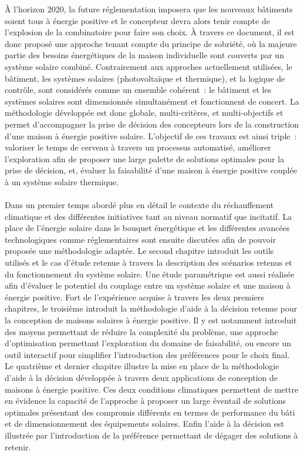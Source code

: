 À l’horizon $2020$, la future réglementation imposera que les nouveaux bâtiments soient
tous à énergie positive et le concepteur devra alors tenir compte de l’explosion de la
combinatoire pour faire son choix. À travers ce document, il est donc proposé une approche
tenant compte du principe de sobriété, où la majeure partie des besoins énergétiques de la
maison individuelle sont couverts par un système solaire combiné. Contrairement aux
approches actuellement utilisées, le bâtiment, les systèmes solaires (photovoltaïque et
thermique), et la logique de contrôle, sont considérés comme un ensemble cohérent~: le
bâtiment et les systèmes solaires sont dimensionnés simultanément et fonctionnent de
concert. La méthodologie développée est donc globale, multi-critères, et multi-objectifs
et permet d’accompagner la prise de décision des concepteurs lors de la construction d’une
maison à énergie positive solaire. L’objectif de ces travaux est ainsi triple~: valoriser
le temps de cerveau à travers un processus automatisé, améliorer l’exploration afin de
proposer une large palette de solutions optimales pour la prise de décision, et, évaluer
la faisabilité d’une maison à énergie positive couplée à un système solaire thermique.


\paragraph{} %
Dans un premier temps abordé plus en détail le contexte du réchauffement
climatique et des différentes initiatives tant au niveau normatif que incitatif. La place
de l’énergie solaire dans le bouquet énergétique et les différentes avancées technologiques
comme réglementaires sont ensuite discutées afin de pouvoir proposée une méthodologie
adaptée. Le second chapitre introduit les outils utilisés et le cas d’étude retenue à
travers la description des scénarios retenus et du fonctionnement du système solaire. Une
étude paramétrique est aussi réalisée afin d’évaluer le potentiel du couplage entre un
système solaire et une maison à énergie positive. Fort de l’expérience acquise à travers
les deux premiers chapitres, le troisième introduit la méthodologie d’aide à la décision
retenue pour la conception de maisons solaires à énergie positive. Il y est notamment
introduit des moyens permettant de réduire la complexité du problème, une approche
d’optimisation permettant l’exploration du domaine de faisabilité, ou encore un outil
interactif pour simplifier l’introduction des préférences pour le choix final. Le
quatrième et dernier chapitre illustre la mise en place de la méthodologie d’aide à la
décision développée à travers deux applications de conception de maisons à énergie
positive. Ces deux conditions climatiques permettent de mettre en évidence la capacité de
l’approche à proposer un large éventail de solutions optimales présentant des compromis
différents en termes de performance du bâti et de dimensionnement des équipements
solaires. Enfin l’aide à la décision est illustrée par l’introduction de la préférence
permettant de dégager des solutions à retenir.
